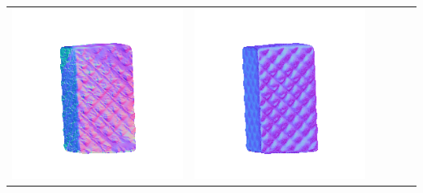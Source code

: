 \begin{tabularx}{\linewidth}{@{}Y@{}Y@{}Y@{}Y@{}Y@{}Y@{}}
\includegraphics[width=\linewidth]{semisynthetic/20160617_18_yu_out.png} &
\includegraphics[width=\linewidth]{semisynthetic/20160617_18_dpsn_out.png} &

\end{tabularx}
